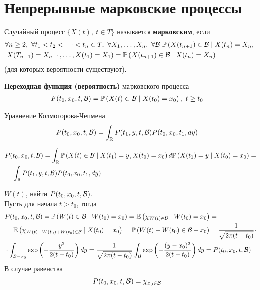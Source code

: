 \newpage
{}
\section{Непрерывные марковские процессы}
\begin{Def}
    Случайный процесс $\{X(t), \ t \in T\}$ называется \textbf{марковским},
    если
    \begin{align*}
      & \forall n \geq 2, \ \forall t_1 < t_2 < \dots < t_n \in T, \ \forall X_1, \dots, X_n, \ \forall \mathcal{B} \ \mathbb{P}\left( X(t_{n+1}) \in\mathcal{B} \mid X(t_n) = X_n, \right. \\
      & \left. X(T_{n-1}) = X_{n-1}, \dots, X(t_1) = X_1 \right) = \mathbb{P}\left( X(t_{n+1}) \in\mathcal{B} \mid X(t_n) = X_n \right)
    \end{align*}
    (для которых вероятности существуют).
\end{Def}
\begin{Def}
    \textbf{Переходная функция (вероятность)} марковского процесса
    \begin{align*}
      & F(t_0, x_0, t, \mathcal{B}) = \mathbb{P}\left( X(t) \in \mathcal{B} \mid X(t_0) = x_0 \right), \ t \geq t_0
    \end{align*}
\end{Def}
\begin{theorem} Уравнение Колмогорова-Чепмена
    \begin{align*}
      & P(t_0, x_0, t, \mathcal{B}) = \int_{\mathbb{R}} P(t_1,y,t,\mathcal{B})P(t_0,x_0, t_1, dy)
    \end{align*}
\end{theorem}
\begin{Proof}
    \begin{align*}
      & P(t_0, x_0, t, \mathcal{B}) = \int_{\mathbb{R}} \mathbb{P}\left( X(t) \in \mathcal{B} \mid X(t_1) = y, X(t_0) = x_0 \right)d\mathbb{P}\left( X(t_1) = y \mid X(t_0) = x_0 \right) = \\
      & = \int_{\mathbb{R}} P(t_1,y,t,\mathcal{B})P(t_0,x_0, t_1, dy)
    \end{align*}
\end{Proof}
\begin{example}
    $W(t)$, найти $P(t_0, x_0, t, \mathcal{B})$.
    \\
    Пусть для начала $t > t_0$, тогда
    \begin{align*}
      & P(t_0, x_0, t, \mathcal{B}) = \mathbb{P}\left( W(t) \in \mathcal{B} \mid W(t_0) = x_0 \right) = \mathbb{E} \left( \chi_{W(t) \in \mathcal{B}} \mid W(t_0) = x_0 \right) = \\
      & = \mathbb{E} \left( \chi_{W(t) - W(t_0) + W(t_0) \in \mathcal{B}} \mid X(t_0) = x_0 \right) = \mathbb{P}\left( W(t) - W(t_0) \in \mathcal{B}-x_0 \right) = \frac{1}{\sqrt{2\pi(t-t_0)}} \cdot \\
      & \cdot \int_{\mathcal{B}-x_0}\exp\left( -\frac{y^2}{2(t-t_0)} \right) dy = \frac{1}{\sqrt{2\pi(t-t_0)}} \int_{\mathcal{B}}\exp\left( -\frac{(y-x_0)^2}{2(t-t_0)} \right) dy = P(t_0, x_0, t, \mathcal{B})
    \end{align*}
    В случае равенства
    \begin{align*}
      & P(t_0, x_0, t, \mathcal{B}) = \chi_{x_0 \in \mathcal{B}}
    \end{align*}
\end{example}
